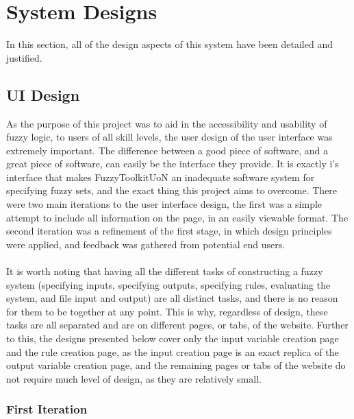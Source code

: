 \section{System Designs}
In this section, all of the design aspects of this system have been detailed and justified. 

\subsection{UI Design}
As the purpose of this project was to aid in the accessibility and usability of fuzzy logic, to users of all skill levels, the user design of the user interface was extremely important. The difference between a good piece of software, and a great piece of software, can easily be the interface they provide. It is exactly i's interface that makes FuzzyToolkitUoN an inadequate software system for specifying fuzzy sets, and the exact thing this project aims to overcome. There were two main iterations to the user interface design, the first was a simple attempt to include all information on the page, in an easily viewable format. The second iteration was a refinement of the first stage, in which design principles were applied, and feedback was gathered from potential end users. \ \\
\ \\
It is worth noting that having all the different tasks of constructing a fuzzy system (specifying inputs, specifying outputs, specifying rules, evaluating the system, and file input and output) are all distinct tasks, and there is no reason for them to be together at any point. This is why, regardless of design, these tasks are all separated and are on different pages, or tabs, of the website. Further to this, the designs presented below cover only the input variable creation page and the rule creation page, as the input creation page is an exact replica of the output variable creation page, and the remaining pages or tabs of the website do not require much level of design, as they are relatively small.

\subsubsection{First Iteration}

